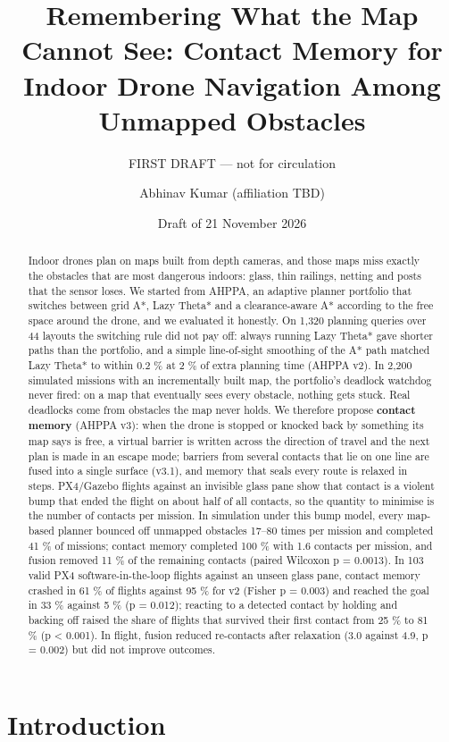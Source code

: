 \documentclass[
]{article}
\title{Remembering What the Map Cannot See: Contact Memory for Indoor
Drone Navigation Among Unmapped Obstacles}
\subtitle{FIRST DRAFT --- not for circulation}
\author{Abhinav Kumar (affiliation TBD)}
\date{Draft of 21 November 2026}
\begin{document}
\maketitle
\begin{abstract}
Indoor drones plan on maps built from depth cameras, and those maps miss
exactly the obstacles that are most dangerous indoors: glass, thin
railings, netting and posts that the sensor loses. We started from
AHPPA, an adaptive planner portfolio that switches between grid A*, Lazy
Theta* and a clearance-aware A* according to the free space around the
drone, and we evaluated it honestly. On 1,320 planning queries over 44
layouts the switching rule did not pay off: always running Lazy Theta*
gave shorter paths than the portfolio, and a simple line-of-sight
smoothing of the A* path matched Lazy Theta* to within 0.2 \% at 2 \% of
extra planning time (AHPPA v2). In 2,200 simulated missions with an
incrementally built map, the portfolio's deadlock watchdog never fired:
on a map that eventually sees every obstacle, nothing gets stuck. Real
deadlocks come from obstacles the map never holds. We therefore propose
\textbf{contact memory} (AHPPA v3): when the drone is stopped or knocked
back by something its map says is free, a virtual barrier is written
across the direction of travel and the next plan is made in an escape
mode; barriers from several contacts that lie on one line are fused into
a single surface (v3.1), and memory that seals every route is relaxed in
steps. PX4/Gazebo flights against an invisible glass pane show that
contact is a violent bump that ended the flight on about half of all
contacts, so the quantity to minimise is the number of contacts per
mission. In simulation under this bump model, every map-based planner
bounced off unmapped obstacles 17--80 times per mission and completed 41
\% of missions; contact memory completed 100 \% with 1.6 contacts per
mission, and fusion removed 11 \% of the remaining contacts (paired
Wilcoxon p = 0.0013). In 103 valid PX4 software-in-the-loop flights
against an unseen glass pane, contact memory crashed in 61 \% of flights
against 95 \% for v2 (Fisher p = 0.003) and reached the goal in 33 \%
against 5 \% (p = 0.012); reacting to a detected contact by holding and
backing off raised the share of flights that survived their first
contact from 25 \% to 81 \% (p \textless{} 0.001). In flight, fusion
reduced re-contacts after relaxation (3.0 against 4.9, p = 0.002) but
did not improve outcomes.
\end{abstract}

\section{Introduction}\label{introduction}
\end{document}
